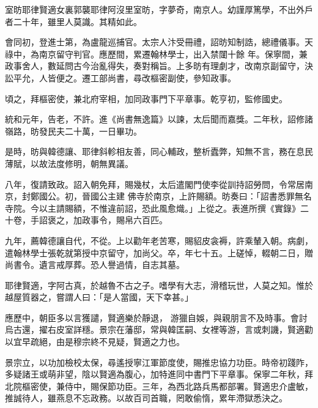 
\begin{pinyinscope}

 室昉耶律賢適女裏郭襲耶律阿沒里室昉，字夢奇，南京人。幼謹厚篤學，不出外戶者二十年，雖里人莫識。其精如此。



 會同初，登進士第，為盧龍巡捕官。太宗人汴受冊禮，詔昉知制誥，總禮儀事。天祿中，為南京留守判官。應歷間，累遷翰林學士，出入禁闥十餘
 年。保寧間，兼政事舍人，數延問古今治亂得失，奏對稱旨。上多昉有理劇才，改南京副留守，決訟平允，人皆便之。遷工部尚書，尋改樞密副使，參知政事。



 頃之，拜樞密使，兼北府宰相，加同政事門下平章事。乾亨初，監修國史。



 統和元年，告老，不許。進《尚書無逸篇》以諫，太后聞而嘉獎。二年秋，詔修諸嶺路，昉發民夫二十萬，一日畢功。



 是時，昉與韓德讓、耶律斜軫相友善，同心輔政，整析蠹弊，知無不言，務在息民薄賦，以故法度修明，朝無異議。



 八年，復請致政。詔入朝免拜，賜幾杖，太后遣閣門使李從訓持詔勞問，令常居南京，封鄭國公。初，晉國公主建
 佛寺於南京，上許賜額。昉奏曰：「詔書悉罪無名寺院。今以主請賜額，不惟違前詔，恐此風愈熾。」上從之。表進所撰《實錄》二十卷，手詔褒之，加政事令，賜帛六百匹。



 九年，薦韓德讓自代，不從。上以勸年老苦寒，賜貂皮衾褥，許乘輦入朝。病劇，遣翰林學士張乾就第授中京留守，加尚父。卒，年七十五。上磋悼，輟朝二日，贈尚書令。遺言戒厚葬。恐人譽過情，自志其墓。



 耶律賢適，字阿古真，於越魯不古之子。嗜學有大志，滑稽玩世，人莫之知。惟於越屋質器之，嘗謂人曰：「是人當國，天下幸甚。」



 應歷中，朝臣多以言獲譴，賢適樂於靜退，
 游獵自娛，與親朋言不及時事。會討烏古還，擢右皮室詳穩。景宗在藩邸，常與韓匡嗣、女裡等游，言或刺譏，賢適勸以宜早疏絕，由是穆宗終不見疑，賢適之力也。



 景宗立，以功加檢校太保，尋遙授寧江軍節度使，賜推忠協力功臣。時帝初踐阼，多疑諸王或萌非望，陰以賢適為腹心，加特進同中書門下平章事。保寧二年秋，拜北院樞密使，兼侍中，賜保節功臣。三年，為西北路兵馬都部署。賢適忠介盧敏，推誠待人，雖燕息不忘政務。以故百司首職，罔敢偷惰，累年滯獄悉決之。




\end{pinyinscope}

